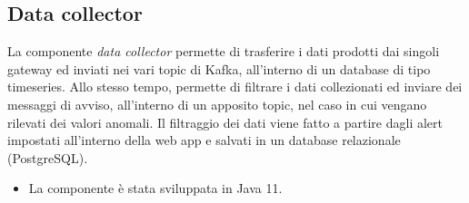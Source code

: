 \subsection{Data collector}
	La componente \textit{data collector} permette di trasferire i dati prodotti dai singoli gateway ed inviati nei vari topic di Kafka, all'interno di un database di tipo timeseries.
	\newline
	Allo stesso tempo, permette di filtrare i dati collezionati ed inviare dei messaggi di avviso, all'interno di un apposito topic, nel caso in cui vengano rilevati dei valori anomali.
	\newline
	Il filtraggio dei dati viene fatto a partire dagli alert impostati all'interno della web app e salvati in un database relazionale (PostgreSQL).
	\begin{itemize}
		\item La componente è stata sviluppata in Java 11.
	\end{itemize}
	
